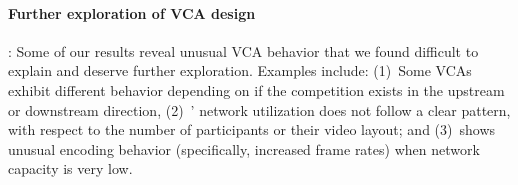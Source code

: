 \begin{comment}
collect VCA performance metrics 
from a large number of users
in real networks and compare the results. Because real-world network conditions
are more complex than in-lab, we can not claim that our in-lab results are representative
in all cases. However, they are still an important step in the overall evaluation of VCAs
and lay the groundwork for future studies.
Experiments in this paper also focus on issues in the last-mile access
network, when there could be problems anywhere along the end-to-end path.
Future work could explore the effects of these parameters,
  \rev{}{or simulate network conditions realistic on wireless connections}.
\rev{However, emulating all kinds of impairments is challenging to accomplish
in-lab. An alternative could be to collect VCA performance metrics }{}
\end{comment}

\paragraph{Further exploration of VCA design}: Some of our results reveal
unusual VCA behavior that we found difficult to explain and deserve further
exploration. Examples include: (1)~Some VCAs exhibit different behavior
depending on if the competition exists in the upstream or downstream
direction, (2)~\teams' network utilization does not follow a clear pattern,
with respect to the number of participants or their video layout; and (3)~\meet shows unusual encoding behavior
(specifically, increased frame rates) when network capacity is very low.
